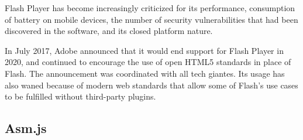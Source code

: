 Flash Player has become increasingly criticized for its performance, consumption of battery on mobile devices, the number of security vulnerabilities that had been discovered in the software, and its closed platform nature.

In July 2017, Adobe announced that it would end support for Flash Player in 2020, and continued to encourage the use of open HTML5 standards in place of Flash. 
The announcement was coordinated with all tech giantes.
Its usage has also waned because of modern web standards that allow some of Flash's use cases to be fulfilled without third-party plugins.

\subsection{Asm.js}
